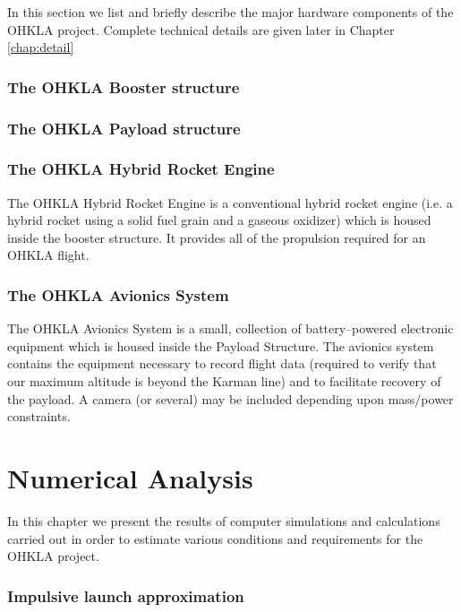 \documentclass{report}
\begin{document}
In this section we list and briefly describe the major hardware components of the OHKLA project.  Complete technical details are given later in Chapter \ref{chap:detail}

\subsection{The OHKLA Booster structure}

\subsection{The OHKLA Payload structure}

\subsection{The OHKLA Hybrid Rocket Engine}

The OHKLA Hybrid Rocket Engine is a conventional hybrid rocket engine (i.e. a hybrid rocket using a solid fuel grain and a gaseous oxidizer) which is housed inside the booster structure.  It provides all of the propulsion required for an OHKLA flight.

\subsection{The OHKLA Avionics System}

The OHKLA Avionics System is a small, collection of battery--powered electronic equipment which is housed inside the Payload Structure.  The avionics system contains the equipment necessary to record flight data (required to verify that our maximum altitude is beyond the Karman line) and to facilitate recovery of the payload.  A camera (or several) may be included depending upon mass/power constraints.

\chapter{Numerical Analysis} \label{chap:numeric}

In this chapter we present the results of computer simulations and calculations carried out in order to estimate various conditions and requirements for the OHKLA project.

\subsection{Impulsive launch approximation}
\end{document}
